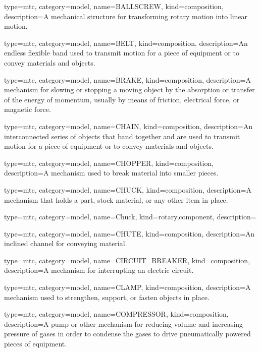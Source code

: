 {
  type=mtc,
  category=model,
  name={BALLSCREW},
  kind={composition},
  description={A mechanical structure for transforming rotary motion into linear motion.}
}


{
  type=mtc,
  category=model,
  name={BELT},
  kind={composition},
  description={An endless flexible band used to transmit motion for a piece of equipment or to convey materials and objects.}
}


{
  type=mtc,
  category=model,
  name={BRAKE},
  kind={composition},
  description={A mechanism for slowing or stopping a moving object by the absorption or transfer of the energy of momentum, usually by means of friction, electrical force, or magnetic force.}
}


{
  type=mtc,
  category=model,
  name={CHAIN},
  kind={composition},
  description={An interconnected series of objects that band together and are used to transmit motion for a piece of equipment or to convey materials and objects.}
}


{
  type=mtc,
  category=model,
  name={CHOPPER},
  kind={composition},
  description={A mechanism used to break material into smaller pieces.}
}


{
  type=mtc,
  category=model,
  name={CHUCK},
  kind={composition},
  description={A mechanism that holds a part, stock material, or any other item in place.}
}


{
  type=mtc,
  category=model,
  name={Chuck},
  kind={rotary,component},
  description={}
}


{
  type=mtc,
  category=model,
  name={CHUTE},
  kind={composition},
  description={An inclined channel for conveying material.}
}


{
  type=mtc,
  category=model,
  name={CIRCUIT\_BREAKER},
  kind={composition},
  description={A mechanism for interrupting an electric circuit.}
}


{
  type=mtc,
  category=model,
  name={CLAMP},
  kind={composition},
  description={A mechanism used to strengthen, support, or fasten objects in place.}
}


{
  type=mtc,
  category=model,
  name={COMPRESSOR},
  kind={composition},
  description={A pump or other mechanism for reducing volume and increasing pressure of gases in order to condense the gases to drive pneumatically powered pieces of equipment.}
}


